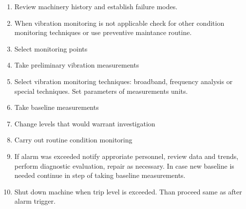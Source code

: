 \begin{enumerate}
\itemsep0pt
\item Review machinery history and establish failure modes.
\item When vibration monitoring is not applicable check for other condition monitoring techniques or use preventive maintance routine.
\item Select monitoring points
\item Take preliminary vibration measurements
\item Select vibration monitoring techniques: broadband, frequency analysis or special techniques. Set parameters of measurements units.
\item Take baseline measurements
\item Change levels that would warrant investigation
\item Carry out routine condition monitoring
\item If alarm was exceeded notify approriate personnel, review data and trends, perform diagnostic evaluation, repair as necessary. In case new baseline is needed continue in step of taking baseline measurements.
\item Shut down machine when trip level is exceeded. Than proceed same as after alarm trigger.
\end{enumerate}

\newpage

 
